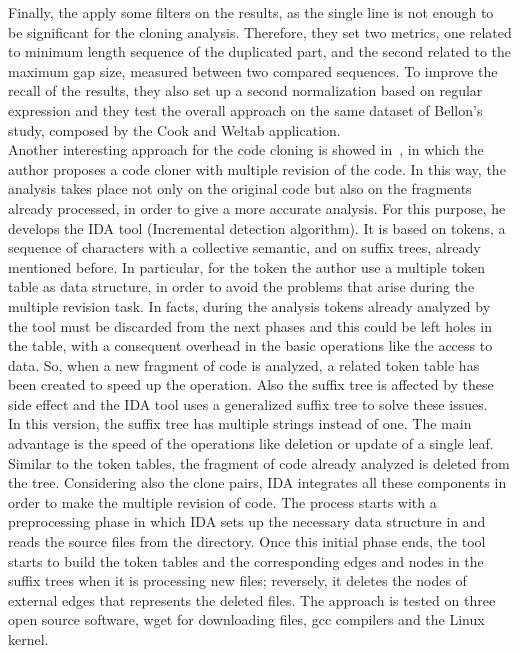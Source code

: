 Finally, the apply some filters on the results, as the single line is not enough to be significant for the cloning analysis. Therefore, they set two metrics, one related to minimum length sequence of the duplicated part, and the second related to the maximum gap size, measured between two compared sequences. To improve the recall of the results, they also set up a second normalization based on regular expression and they test the overall approach on the same dataset of Bellon's study, composed by the Cook and Weltab application. 
\\
Another interesting approach for the code cloning is showed in~\cite{nils_gode_incremental_2008}, in which the author proposes a code cloner with multiple revision of the code. In this way, the analysis takes place not only on the original code but also on the fragments already processed, in order to give a more accurate analysis. For this purpose, he develops the IDA tool (Incremental detection algorithm). It is based on tokens, a sequence of characters with a collective semantic, and on suffix trees, already mentioned before. In particular, for the token the author use a multiple token table as data structure, in order to avoid the problems that arise during the multiple revision task. In facts, during the analysis tokens already analyzed by the tool must be discarded from the next phases and this could be left holes in the table, with a consequent overhead in the basic operations like the access to data. So, when a new fragment of code is analyzed, a related token table has been created to speed up the operation. Also the suffix tree is affected by these side effect and the IDA tool uses a generalized suffix tree to solve these issues. \\
\newpage
In this version, the suffix tree has multiple strings instead of one. The main advantage is the speed of the operations like deletion or update of a single leaf. Similar to the token tables, the fragment of code already analyzed is deleted from the tree. Considering also the clone pairs, IDA integrates all these components in order to make the multiple revision of code. The process starts with a preprocessing phase in which IDA sets up the necessary data structure in and reads the source files from the directory. Once this initial phase ends, the tool starts to build the token tables and the corresponding edges and nodes in the suffix trees when it is processing new files; reversely, it deletes the nodes of external edges that represents the deleted files. The approach is tested on three open source software, wget for downloading files, gcc compilers and the Linux kernel. \\
